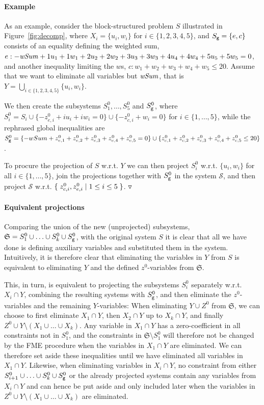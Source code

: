 \paragraph{Example}
As an example, consider the block-structured problem $S$ illustrated in Figure~\ref{fig:decomp}, where $X_i=\{u_i, w_i\}$ for $i\in\{1,2,3,4,5\}$, and $S_{\texttt{g}}=\{e,c\}$ consists of an equality defining the weighted sum, $e: - \mathit{wSum} + 1u_1+ 1w_1 + 2u_2+ 2w_2 + 3u_3+ 3w_3 + 4u_4+ 4w_4 + 5u_5+ 5w_5 = 0$, and another inequality limiting the $w$s, $c: w_1 + w_2 + w_3 + w_4 + w_5\leq 20$. Assume that we want to eliminate all variables but $\mathit{wSum}$, that is $Y = \bigcup_{i\in\{1,2,3,4,5\}}\{u_i,w_i\}$.

We then create the subsystems $S^0_1, \ldots, S^0_5$ and $S^0_{\texttt{g}}$, where $S^0_i = S_i \cup 
\{-z^0_{e,i} + iu_i + iw_i = 0 \} \cup \{ -z^0_{c,i} + w_i = 0 \}$ for $i\in\{1,\ldots,5\}$, while the rephrased global inequalities are $S_{\texttt{g}}^0 = \{-wSum + z^0_{e,1} + z^0_{e,2} + z^0_{e,3} + z^0_{e,4} + z^0_{e,5} = 0 \} \cup \{ z^0_{c,1} +z^0_{c,2} +z^0_{c,3}+z^0_{c,4}+z^0_{c,5} \leq 20\}$.   

To procure the projection of $S$ w.r.t. $Y$ we can then project $S_i^0$ w.r.t. $\{u_i, w_i\}$ for all $i\in\{1,\ldots,  5\}$, join the projections together with $S^0_{\texttt{g}}$ in the system $\mathcal{S}$, and then project $\mathcal{S}$ w.r.t. $\{\;{z^0_{c,i}, z^0_{e,i}}\;|\;{1\leq i\leq 5}\;\}$. {$\triangledown$}

\paragraph{Equivalent projections}
Comparing the union of the new (unprojected) subsystems, $\mathfrak{S} = S_1^0\cup\ldots\cup S_k^0\cup S_{\texttt{g}}^0$, with the original system $S$ it is clear that
all we have done is defining auxiliary variables and substituted them in the system. Intuitively, it is therefore clear that eliminating the variables in $Y$ from $S$ is equivalent to eliminating $Y$ and the defined $z^0$-variables from $\mathfrak{S}$. 

This, in turn, is equivalent to projecting the subsystems $S^0_i$ separately w.r.t. $X_i\cap Y$, combining the resulting systems with $S^0_{\texttt{g}}$, and then eliminate the $z^0$-variables and the remaining $Y$-variables: %
%
When eliminating $Y\cup Z^0$ from $\mathfrak{S}$, we can choose to first eliminate $X_1\cap Y$, then $X_2\cap Y$ up to $X_k\cap Y$, and finally $Z^0\cup Y\setminus(X_1\cup \ldots\cup X_k)$. 
Any variable in $X_1\cap Y$ has a zero-coefficient in all constraints not in $S^0_1$, and the constraints in $\mathfrak{S}\setminus S^0_1$ will therefore not be changed by the FME procedure when the variables in $X_1\cap Y$ are eliminated.  We can therefore set aside these inequalities until we have eliminated all variables in $X_1\cap Y$. Likewise, when eliminating variables in $X_i\cap Y$, no constraint from either $S_{i+1}^0\cup \ldots \cup S_k^0\cup S_{\texttt{g}}^0$ or the already projected systems contain any variables from $X_i\cap Y$ and can hence be put aside and only included later when the variables in $Z^0\cup Y\setminus(X_1\cup \ldots\cup X_k)$ are eliminated.

